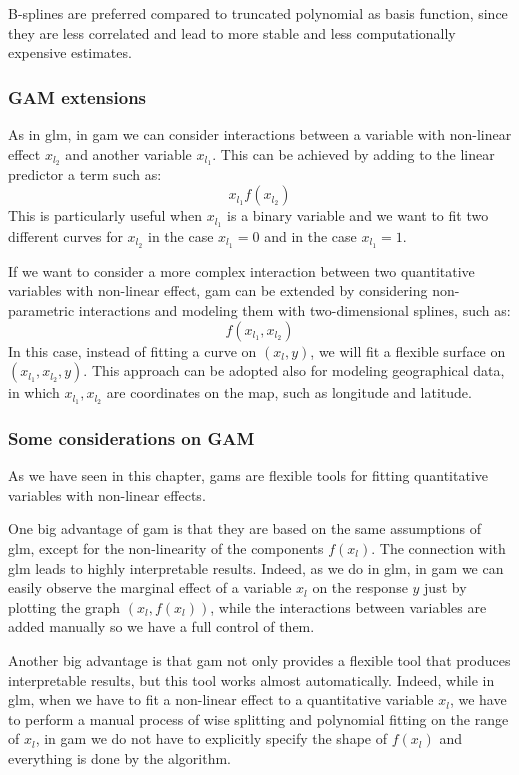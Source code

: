 \documentclass[a4paper, twoside, openright, 12pt]{report}
\theoremstyle{definition}
\theoremstyle{definition}
\theoremstyle{definition}
\theoremstyle{remark}
\begin{document}
B-splines are preferred compared to truncated polynomial as basis function, since they are less correlated and lead to more stable and less computationally expensive estimates.

\hypertarget{gam-extensions}{%
\subsubsection{GAM extensions}\label{gam-extensions}}

As in \ac{glm}, in \ac{gam} we can consider interactions between a variable with non-linear effect \(x_{l_2}\) and another variable \(x_{l_1}\). This can be achieved by adding to the linear predictor a term such as:
\[
x_{l_1} f(x_{l_2})
\]
This is particularly useful when \(x_{l_1}\) is a binary variable and we want to fit two different curves for \(x_{l_2}\) in the case \(x_{l_1}=0\) and in the case \(x_{l_1}=1\).

If we want to consider a more complex interaction between two quantitative variables with non-linear effect, \ac{gam} can be extended by considering non-parametric interactions and modeling them with two-dimensional splines, such as:
\[
f(x_{l_1}, x_{l_2})
\]
In this case, instead of fitting a curve on \((x_l, y)\), we will fit a flexible surface on \((x_{l_1}, x_{l_2}, y)\). This approach can be adopted also for modeling geographical data, in which \(x_{l_1}, x_{l_2}\) are coordinates on the map, such as longitude and latitude.

\hypertarget{some-considerations-on-gam}{%
\subsubsection{Some considerations on GAM}\label{some-considerations-on-gam}}

As we have seen in this chapter, \ac{gam}s are flexible tools for fitting quantitative variables with non-linear effects.

One big advantage of \ac{gam} is that they are based on the same assumptions of \ac{glm}, except for the non-linearity of the components \(f(x_{l})\). The connection with \ac{glm} leads to highly interpretable results. Indeed, as we do in \ac{glm}, in \ac{gam} we can easily observe the marginal effect of a variable \(x_l\) on the response \(y\) just by plotting the graph \(\left(x_l, f(x_l)\right)\), while the interactions between variables are added manually so we have a full control of them.

Another big advantage is that \ac{gam} not only provides a flexible tool that produces interpretable results, but this tool works almost automatically. Indeed, while in \ac{glm}, when we have to fit a non-linear effect to a quantitative variable \(x_l\), we have to perform a manual process of wise splitting and polynomial fitting on the range of \(x_l\), in \ac{gam} we do not have to explicitly specify the shape of \(f(x_l)\) and everything is done by the algorithm.
\end{document}
